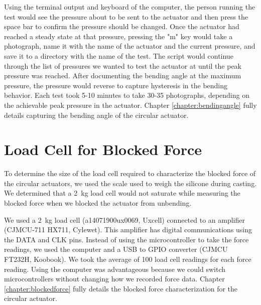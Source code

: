 Using the terminal output and keyboard of the computer, the person running the test would see the pressure about to be sent to the actuator and then press the space bar to confirm the pressure should be changed. Once the actuator had reached a steady state at that pressure, pressing the "m" key would take a photograph, name it with the name of the actuator and the current pressure, and save it to a directory with the name of the test. The script would continue through the list of pressures we wanted to test the actuator at until the peak pressure was reached. After documenting the bending angle at the maximum pressure, the pressure would reverse to capture hysteresis in the bending behavior. Each test took 5-10 minutes to take 30-35 photographs, depending on the achievable peak pressure in the actuator. Chapter \ref{chapter:bendingangle} fully details capturing the bending angle of the circular actuator. 

\section{Load Cell for Blocked Force}

To determine the size of the load cell required to characterize the blocked force of the circular actuators, we used the scale used to weigh the silicone during casting. We determined that a 2~kg load cell would not saturate while measuring the blocked force when we blocked the actuator from unbending. 

We used a 2~kg load cell (a14071900ux0069, Uxcell) connected to an amplifier (CJMCU-711 HX711, Cylewet). This amplifier has digital communications using the DATA and CLK pins. Instead of using the microcontroller to take the force readings, we used the computer and a USB to GPIO converter (CJMCU FT232H, Koobook). We took the average of 100 load cell readings for each force reading. Using the computer was advantageous because we could switch microcontrollers without changing how we recorded force data. Chapter \ref{chapter:blockedforce} fully details the blocked force characterization for the circular actuator. 



